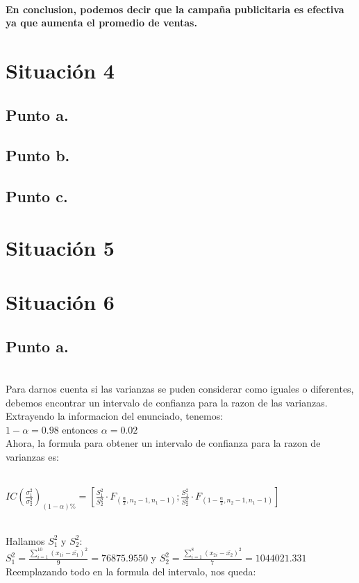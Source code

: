 \documentclass[letterpaper,12pt,onecolumn,titlepage]{article}
\begin{document}
~\\ \textbf{En conclusion, podemos decir que la campa\~{n}a publicitaria es efectiva ya que aumenta el promedio de ventas.}

\pagebreak\section{Situaci\'{o}n 4}
\subsection{Punto a.}
\subsection{Punto b.}
\subsection{Punto c.}

\pagebreak\section{Situaci\'{o}n 5}



\pagebreak\section{Situaci\'{o}n 6}
\subsection{Punto a.}
~\\ Para darnos cuenta si las varianzas se puden considerar como iguales o diferentes, debemos encontrar un intervalo de confianza para la razon de las varianzas.
~\\ Extrayendo la informacion del enunciado, tenemos:
~\\ $1-\alpha=0.98$ entonces $\alpha=0.02$
~\\ Ahora, la formula para obtener un intervalo de confianza para la razon de varianzas es:

~\\ $IC(\frac{\sigma_1^{2}}{\sigma_2^{2}})_{(1-\alpha)\%}=\left[\frac{S_{1} ^{2}}{S_{2} ^{2}}\cdot F_{(\frac{\alpha}{2},n_{2}-1,n_{1}-1)}  ; \frac{S_{1} ^{2}}{S_{2} ^{2}}\cdot F_{(1-\frac{\alpha}{2},n_{2}-1,n_{1}-1)} \right]$

~\\ Hallamos $S_{1}^2$ y $S_{2}^2$:
~\\ $S_{1}^2=\frac{\sum\limits_{i=1}^{10}(x_{1i}-\bar{x_1})^2}{9}=76875.9550$ y $S_{2}^2=\frac{\sum\limits_{i=1}^{8}(x_{2i}-\bar{x_2})^2}{7}=1044021.331$
~\\ Reemplazando todo en la formula del intervalo, nos queda:
\end{document}
